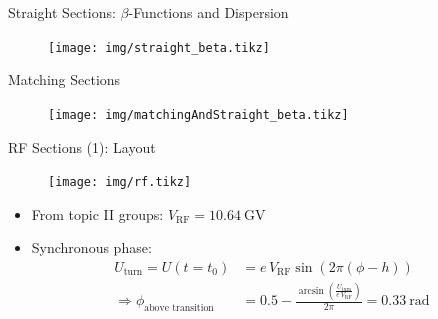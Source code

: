 \documentclass{beamer}
\begin{document}
\begin{frame}[t,fragile]{Straight Sections: $\beta$-Functions and Dispersion}
\begin{figure}
\centering
\texttt{[image: img/straight\_beta.tikz]}
\end{figure}
\end{frame}


\begin{frame}[t,fragile]{Matching Sections}
\begin{figure}
\centering
\texttt{[image: img/matchingAndStraight\_beta.tikz]}
\end{figure}
\end{frame}

\begin{frame}[t,fragile]{RF Sections (1): Layout}
\begin{figure}
\centering
\texttt{[image: img/rf.tikz]}
\end{figure}
\begin{itemize}
\item From topic II groups: $V_\text{RF}=\SI{10.64}{\giga\volt}$
\item Synchronous phase:
\begin{align*}
U_\text{turn} = U(t=t_0) &= e\,V_\text{RF} \sin\left(2\pi(\phi-h)\right)\\
\Rightarrow \phi_\text{above transition} &= 0.5 - \frac{\arcsin\left(\frac{U_\text{turn}}{e\,V_\text{RF}}\right)}{2\pi} = \SI{0.33}{\radian}
\end{align*}
\end{itemize}
\end{frame}
\end{document}
